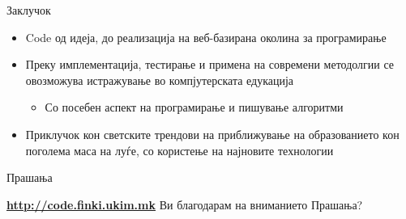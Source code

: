 \begin{frame}{Заклучок}
    \begin{itemize}
      \item Code од идеја, до реализација на веб-базирана околина за
      програмирање
      \item Преку имплементација, тестирање и примена на современи
      методолгии се овозможува истражување во компјутерската едукација
      \begin{itemize}
        \item Со посебен аспект на програмирање и пишување алгоритми
      \end{itemize}
      \item Приклучок кон светските трендови на приближување
      на образованието кон поголема маса на луѓе, со користење на најновите
      технологии
    \end{itemize}
\end{frame}

\begin{frame}{Прашања}{}
    \begin{center}
    \Large{
    \href{http://code.finki.ukim.mk/}{\textbf{http://code.finki.ukim.mk}}}
    \vfill
    \huge{Ви благодарам на вниманието}
    \vfill    
    \Huge{Прашања?}
    \end{center}
\end{frame}








